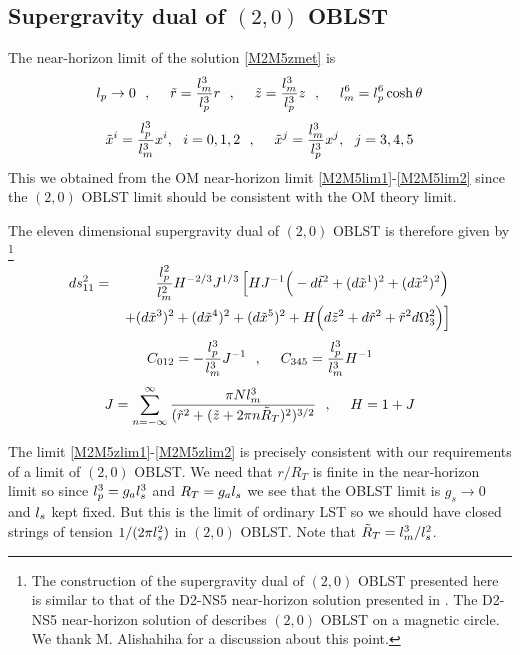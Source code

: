\documentclass[a4paper,twoside,titlepage,12pt]{article}
\begin{document}
\subsection{Supergravity dual of $(2,0)$ OBLST}

The near-horizon limit of the solution \eqref{M2M5zmet} is
%
\begin{equation}
\label{M2M5zlim1}
l_p \rightarrow 0 \ \ ,\ \ \ \ 
\tilde{r} = \frac{l_m^3}{l_p^3} r \ \ ,\ \ \ \ 
\tilde{z} = \frac{l_m^3}{l_p^3} z \ \ ,\ \ \ \ 
l_m^6 = l_p^6 \cosh \theta
\end{equation}
%
\begin{equation}
\label{M2M5zlim2}
\tilde{x}^i = \frac{l_p^3}{l_m^3} x^i, \ \ i=0,1,2 \ \ ,\ \ \ \ 
\tilde{x}^j = \frac{l_m^3}{l_p^3} x^j,\ \ j=3,4,5 
\end{equation}
%
This we obtained from the OM near-horizon limit 
\eqref{M2M5lim1}-\eqref{M2M5lim2} since the $(2,0)$ OBLST limit
should be consistent with the OM theory limit.

The eleven dimensional supergravity 
dual of $(2,0)$ OBLST is therefore given by%
\footnote{The construction of the
supergravity dual of $(2,0)$ OBLST presented here 
is similar to that of the D2-NS5 near-horizon solution presented in 
\cite{Alishahiha:2000er}. The D2-NS5 near-horizon solution of 
\cite{Alishahiha:2000er} describes $(2,0)$ OBLST on a magnetic circle.
We thank M. Alishahiha for a discussion about this point.}
%
\begin{eqnarray}
\label{NHOB20met}
ds_{11}^2 &=& \frac{l_p^2}{l_m^2} H^{-2/3} J^{1/3} \left[
H  J^{-1} \Big( - d\tilde{t}^2 
+ (d\tilde{x}^1)^2 + (d\tilde{x}^2)^2 \Big)
\right. \nonumber \\ && \left.
+ (d\tilde{x}^3)^2 + (d\tilde{x}^4)^2 + (d\tilde{x}^5)^2 
+ H \Big( d\tilde{z}^2 + d\tilde{r}^2 + \tilde{r}^2 d\Omega_3^2 \Big) \right]
\end{eqnarray}
%
\begin{equation}
\label{NHOB20pot}
C_{012} = - \frac{l_p^3}{l_m^3} J^{-1} \ \ ,\ \ \ \ 
C_{345} = \frac{l_p^3}{l_m^3} H^{-1}
\end{equation}
%
\begin{equation}
J = \sum_{n=-\infty}^{\infty} 
\frac{\pi N l_m^3}{(\tilde{r}^2 
+ (\tilde{z}+2\pi n \tilde{R}_T)^2 )^{3/2}}
\ \ ,\ \ \ \ 
H = 1 + J
\end{equation}

The limit \eqref{M2M5zlim1}-\eqref{M2M5zlim2} is
precisely consistent with our requirements of a limit of 
$(2,0)$ OBLST. 
We need that $r/R_T$ is finite in the near-horizon limit 
so since \( l_p^3 = g_a l_s^3 \) and \( R_T = g_a l_s \)
we see that the OBLST limit is \( g_s \rightarrow 0 \)
and \( l_s \) kept fixed. But this is the limit of ordinary LST
so we should have closed strings of tension \( 1/ (2\pi l_s^2) \)
in $(2,0)$ OBLST. Note that $\tilde{R}_T = l_m^3 / l_s^2$.
\end{document}
